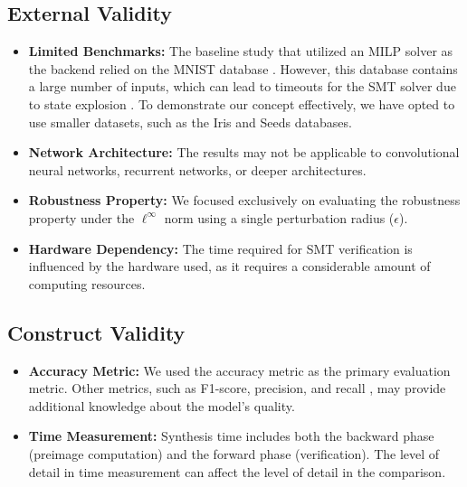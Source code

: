 \subsection{External Validity}

\begin{itemize}
    \item \textbf{Limited Benchmarks:} The baseline study that utilized an MILP solver as the backend relied on the MNIST database \cite{cai2025certified}. However, this database contains a large number of inputs, which can lead to timeouts for the SMT solver due to state explosion \cite{henzinger2021scalable, eleftheriadis2022neuralnetworkequivalencechecking, cordeiro2025neuralnetworkverificationprogramming}. To demonstrate our concept effectively, we have opted to use smaller datasets, such as the Iris and Seeds databases.
    
    \item \textbf{Network Architecture:} The results may not be applicable to convolutional neural networks, recurrent networks, or deeper architectures.
    
    \item \textbf{Robustness Property:} We focused exclusively on evaluating the robustness property under the $\ell^\infty$ norm using a single perturbation radius ($\epsilon$).
    
    \item \textbf{Hardware Dependency:} The time required for SMT verification is influenced by the hardware used, as it requires a considerable amount of computing resources.
\end{itemize}

\subsection{Construct Validity}
\begin{itemize}

 \item \textbf{Accuracy Metric:} We used the accuracy metric as the primary evaluation metric. Other metrics, such as F1-score, precision, and recall \cite{aldjanabi_2021}, may provide additional knowledge about the model's quality.
    
    \item \textbf{Time Measurement:} Synthesis time includes both the backward phase (preimage computation) and the forward phase (verification). The level of detail in time measurement can affect the level of detail in the comparison.
\end{itemize}


